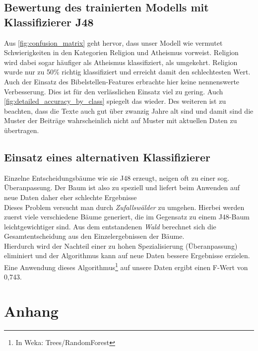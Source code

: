 \documentclass[
	11pt,
	a4paper
]{scrartcl}
\begin{document}
\subsection{Bewertung des trainierten Modells mit Klassifizierer J48}
Aus \autoref{fig:confusion_matrix} geht hervor, dass unser Modell wie vermutet Schwierigkeiten in den Kategorien Religion und Atheismus vorweist. 
Religion wird dabei sogar häufiger als Atheismus klassifiziert, als umgekehrt. 
Religion wurde nur zu 50\% richtig klassifiziert und erreicht damit den schlechtesten Wert. 
Auch der Einsatz des Bibelstellen-Features erbrachte hier keine nennenswerte
Verbesserung.
Dies ist für den verlässlichen Einsatz viel zu gering.
Auch \autoref{fig:detailed_accuracy_by_class} spiegelt das wieder.
Des weiteren ist zu beachten, dass die Texte auch gut über zwanzig Jahre alt sind und damit sind die Muster der Beiträge wahrscheinlich nicht auf Muster mit aktuellen Daten zu übertragen.

\subsection{Einsatz eines alternativen Klassifizierer}
Einzelne Entscheidungsbäume wie sie J48 erzeugt, neigen oft zu einer sog. Überanpassung. Der Baum ist also zu speziell und liefert beim
Anwenden auf neue Daten daher eher schlechte Ergebnisse\\

Dieses Problem versucht man durch \emph{Zufallswälder} zu umgehen. Hierbei werden zuerst viele verschiedene Bäume generiert, die im
Gegensatz zu einem J48-Baum leichtgewichtiger sind. Aus dem entstandenen \emph{Wald} berechnet sich die Gesamtentscheidung aus den
Einzelergebnissen der Bäume.\\
Hierdurch wird der Nachteil einer zu hohen Spezialisierung (Überanpassung) eliminiert und der
Algorithmus kann auf neue Daten bessere Ergebnisse erzielen.\\

Eine Anwendung dieses Algorithmus\footnote{In Weka: Trees/RandomForest} auf unsere Daten ergibt einen F-Wert von 0,743.

\newpage
\section{Anhang}
\end{document}
